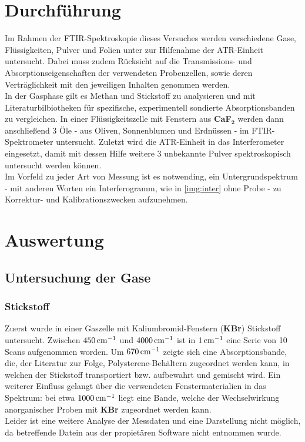 \documentclass[a4paper,10pt,twocolumn]{article}
\newcommand{\fett}[1]{\textbf{#1}}
\begin{document}
	\section{Durchführung}

		Im Rahmen der FTIR-Spektroskopie dieses Versuches werden verschiedene Gase, Fl\"ussigkeiten, Pulver und Folien unter zur Hilfenahme der ATR-Einheit untersucht. Dabei muss zudem R\"ucksicht auf die Transmissions- und Absorptionseigenschaften der verwendeten Probenzellen, sowie deren Vertr\"aglichkeit mit den jeweiligen Inhalten genommen werden.\\
		In der Gasphase gilt es Methan und Stickstoff zu analysieren und mit Literaturbilbiotheken f\"ur spezifische, experimentell sondierte Absorptionsbanden zu vergleichen. In einer Fl\"ussigkeitszelle mit Fenstern aus \fett{CaF}$_{\fett{2}}$ werden dann anschlie{\ss}end 3 \"Ole - aus Oliven, Sonnenblumen und Erdn\"ussen - im FTIR-Spektrometer untersucht. Zuletzt wird die ATR-Einheit in das Interferometer eingesetzt, damit mit dessen Hilfe weitere 3 unbekannte Pulver spektroskopisch untersucht werden k\"onnen.\\
		Im Vorfeld zu jeder Art von Messung ist es notwending, ein Untergrundspektrum - mit anderen Worten ein Interferogramm, wie in \autoref{img:inter} ohne Probe - zu Korrektur- und Kalibrationszwecken aufzunehmen.

	\section{Auswertung}

		\subsection{Untersuchung der Gase}

		\subsubsection*{Stickstoff}
		Zuerst wurde in einer Gaszelle mit Kaliumbromid-Fenstern (\fett{KBr}) Stickstoff untersucht. Zwischen $\unit[450]{cm^{-1}}$ und $\unit[4000]{cm^{-1}}$ ist in $\unit[1]{cm^{-1}}$ eine Serie von 10 Scans aufgenommen worden. Um $\unit[670]{cm^{-1}}$ zeigte sich eine Absorptionsbande, die, der Literatur zur Folge, Polysterene-Beh\"altern zugeordnet werden kann, in welchen der Stickstoff transportiert bzw. aufbewahrt und gemischt wird. Ein weiterer Einfluss gelangt \"uber die verwendeten Fenstermaterialien in das Spektrum: bei etwa $\unit[1000]{cm^{-1}}$  liegt eine Bande, welche der Wechselwirkung anorganischer Proben mit \fett{KBr} zugeordnet werden kann.\\
		Leider ist eine weitere Analyse der Messdaten und eine Darstellung nicht m\"oglich, da betreffende Datein aus der propiet\"aren Software nicht entnommen wurde.
		
\end{document}
